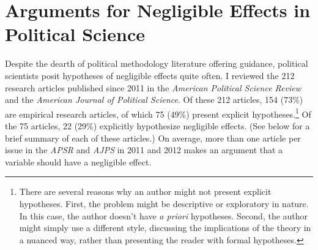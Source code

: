 \documentclass[12pt]{article}
\begin{document}
\clearpage
\section*{Arguments for Negligible Effects in Political Science}

Despite the dearth of political methodology literature offering guidance, political scientists posit hypotheses of negligible effects quite often. I reviewed the 212 research articles published since 2011 in the \textit{American Political Science Review} and the \textit{American Journal of Political Science}. Of these 212 articles, 154 (73\%) are empirical research articles, of which 75 (49\%) present explicit hypotheses.\footnote{There are several reasons why an author might not present explicit hypotheses. First, the problem might be descriptive or exploratory in nature. In this case, the author doesn't have \textit{a priori} hypotheses. Second, the author might simply use a different style, discussing the implications of the theory in a nuanced way, rather than presenting the reader with formal hypotheses.} Of the 75 articles, 22 (29\%) explicitly hypothesize negligible effects. (See below for a brief summary of each of these articles.) On average, more than one article per issue in the \textit{APSR} and \textit{AJPS} in 2011 and 2012 makes an argument that a variable should have a negligible effect.
\end{document}
